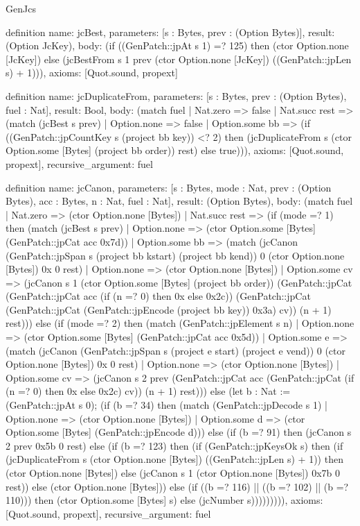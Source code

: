 \begin{lexlean}{GenJcs}
\begin{semanticmodule}
definition{
  name: jcBest,
  parameters: [s : Bytes, prev : (Option Bytes)],
  result: (Option JcKey),
  body: (if ((GenPatch::jpAt s 1) =? 125) then (ctor Option.none [JcKey]) else (jcBestFrom s 1 prev (ctor Option.none [JcKey]) ((GenPatch::jpLen s) + 1))),
  axioms: [Quot.sound, propext]
}

definition{
  name: jcDuplicateFrom,
  parameters: [s : Bytes, prev : (Option Bytes), fuel : Nat],
  result: Bool,
  body: (match fuel
    | Nat.zero => false
    | Nat.succ rest => (match (jcBest s prev)
      | Option.none => false
      | Option.some bb => (if ((GenPatch::jpCountKey s (project bb key)) <? 2) then (jcDuplicateFrom s (ctor Option.some [Bytes] (project bb order)) rest) else true))),
  axioms: [Quot.sound, propext],
  recursive_argument: fuel
}

definition{
  name: jcCanon,
  parameters: [s : Bytes, mode : Nat, prev : (Option Bytes), acc : Bytes, n : Nat, fuel : Nat],
  result: (Option Bytes),
  body: (match fuel
    | Nat.zero => (ctor Option.none [Bytes])
    | Nat.succ rest => (if (mode =? 1) then (match (jcBest s prev)
      | Option.none => (ctor Option.some [Bytes] (GenPatch::jpCat acc 0x7d))
      | Option.some bb => (match (jcCanon (GenPatch::jpSpan s (project bb kstart) (project bb kend)) 0 (ctor Option.none [Bytes]) 0x 0 rest)
        | Option.none => (ctor Option.none [Bytes])
        | Option.some cv => (jcCanon s 1 (ctor Option.some [Bytes] (project bb order)) (GenPatch::jpCat (GenPatch::jpCat acc (if (n =? 0) then 0x else 0x2c)) (GenPatch::jpCat (GenPatch::jpCat (GenPatch::jpEncode (project bb key)) 0x3a) cv)) (n + 1) rest))) else (if (mode =? 2) then (match (GenPatch::jpElement s n)
      | Option.none => (ctor Option.some [Bytes] (GenPatch::jpCat acc 0x5d))
      | Option.some e => (match (jcCanon (GenPatch::jpSpan s (project e start) (project e vend)) 0 (ctor Option.none [Bytes]) 0x 0 rest)
        | Option.none => (ctor Option.none [Bytes])
        | Option.some cv => (jcCanon s 2 prev (GenPatch::jpCat acc (GenPatch::jpCat (if (n =? 0) then 0x else 0x2c) cv)) (n + 1) rest))) else (let b : Nat := (GenPatch::jpAt s 0); (if (b =? 34) then (match (GenPatch::jpDecode s 1)
      | Option.none => (ctor Option.none [Bytes])
      | Option.some d => (ctor Option.some [Bytes] (GenPatch::jpEncode d))) else (if (b =? 91) then (jcCanon s 2 prev 0x5b 0 rest) else (if (b =? 123) then (if (GenPatch::jpKeysOk s) then (if (jcDuplicateFrom s (ctor Option.none [Bytes]) ((GenPatch::jpLen s) + 1)) then (ctor Option.none [Bytes]) else (jcCanon s 1 (ctor Option.none [Bytes]) 0x7b 0 rest)) else (ctor Option.none [Bytes])) else (if ((b =? 116) || ((b =? 102) || (b =? 110))) then (ctor Option.some [Bytes] s) else (jcNumber s))))))))),
  axioms: [Quot.sound, propext],
  recursive_argument: fuel
}


\end{semanticmodule}
\end{lexlean}
